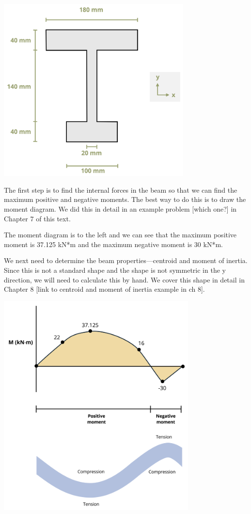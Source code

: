 \documentclass[
  letterpaper,
  DIV=11,
  numbers=noendperiod]{scrreprt}
\begin{document}
\begin{tcolorbox}
\begin{center}
\includegraphics[width=3.85417in,height=\textheight]{images/CH9 PNGs/Example 9.2 part 3.png}
\end{center}

The first step is to find the internal forces in the beam so that we can
find the maximum positive and negative moments. The best way to do this
is to draw the moment diagram. We did this in detail in an example
problem {[}which one?{]} in Chapter 7 of this text.

The moment diagram is to the left and we can see that the maximum
positive moment is 37.125 kN*m and the maximum negative moment is 30
kN*m.

We next need to determine the beam properties---centroid and moment of
inertia. Since this is not a standard shape and the shape is not
symmetric in the y direction, we will need to calculate this by hand. We
cover this shape in detail in Chapter 8 {[}link to centroid and moment
of inertia example in ch 8{]}.

\begin{center}
\includegraphics[width=3.95833in,height=\textheight]{images/CH9 PNGs/Example 9.2 part 4.png}
\end{center}


\end{tcolorbox}
\end{document}
